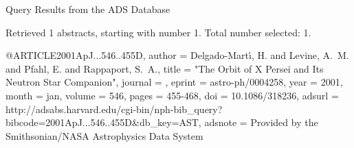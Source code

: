 Query Results from the ADS Database


Retrieved 1 abstracts, starting with number 1.  Total number selected: 1.

@ARTICLE{2001ApJ...546..455D,
   author = {{Delgado-Mart{\'{\i}}}, H. and {Levine}, A.~M. and {Pfahl}, E. and 
	{Rappaport}, S.~A.},
    title = "{The Orbit of X Persei and Its Neutron Star Companion}",
  journal = {\apj},
   eprint = {astro-ph/0004258},
     year = 2001,
    month = jan,
   volume = 546,
    pages = {455-468},
      doi = {10.1086/318236},
   adsurl = {http://adsabs.harvard.edu/cgi-bin/nph-bib_query?bibcode=2001ApJ...546..455D&db_key=AST},
  adsnote = {Provided by the Smithsonian/NASA Astrophysics Data System}
}


